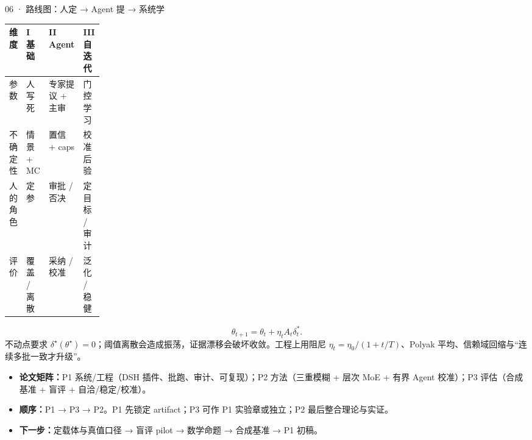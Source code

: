 \documentclass[final]{beamer}
\newcommand{\kw}[1]{\textcolor{csred}{\textbf{#1}}}
\begin{document}
\begin{frame}[t]
\begin{columns}[t,onlytextwidth]
\begin{column}{0.315\textwidth}
\begin{block}{06 ·  路线图：人定 → Agent 提 → 系统学}
\vspace{2mm}
{\fontsize{22}{28}\selectfont
\begin{tabularx}{\linewidth}{@{}p{0.18\linewidth}YYY@{}}
\toprule
维度 & I 基础 & II Agent & III 自迭代 \\
\midrule
参数 & 人写死 & 专家提议 + 主审 & 门控学习 \\
不确定性 & 情景 + MC & 置信 + caps & 校准后验 \\
人的角色 & 定参 & 审批 / 否决 & 定目标 / 审计 \\
评价 & 覆盖 / 离散 & 采纳 / 校准 & 泛化 / 稳健 \\
\bottomrule
\end{tabularx}}

\vspace{2mm}
{\fontsize{24}{30}\selectfont
\[
\theta_{t+1}=\theta_t+\eta_tA_t\delta_t^*.
\]
}
不动点要求 \(\delta^\star(\theta^\star)=0\)；阈值离散会造成振荡，证据漂移会破坏收敛。工程上用阻尼 \(\eta_t=\eta_0/(1+t/T)\)、Polyak 平均、信赖域回缩与“连续多批一致才升级”。

\vspace{2mm}
\begin{itemize}
\item \kw{论文矩阵：}P1 系统/工程（DSH 插件、批跑、审计、可复现）；P2 方法（三重模糊 + 层次 MoE + 有界 Agent 校准）；P3 评估（合成基准 + 盲评 + 自洽/稳定/校准）。
\item \kw{顺序：}P1 → P3 → P2。P1 先锁定 artifact；P3 可作 P1 实验章或独立；P2 最后整合理论与实证。
\item \kw{下一步：}定载体与真值口径 → 盲评 pilot → 数学命题 → 合成基准 → P1 初稿。
\end{itemize}
\end{block}

\end{column}
\end{columns}


\end{frame}
\end{document}

